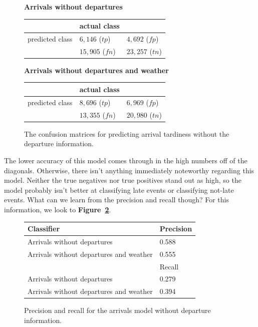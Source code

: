 \documentclass[11pt]{article} %
\begin{document}
\begin{figure}
    \textbf{Arrivals without departures}

    \begin{tabular}[h]{l|ll}
                         & actual class &  \\
         \hline
         predicted class & $6,146$ ($tp$)& $4,692$ ($fp$)\\
                         & $15,905$ ($fn$)& $23,257$ ($tn$)\\
    \end{tabular}

    \textbf{Arrivals without departures and weather}

    \begin{tabular}[h]{l|ll}
                         & actual class &  \\
         \hline
         predicted class & $8,696$ ($tp$)& $6,969$ ($fp$)\\
                         & $13,355$ ($fn$)& $20,980$ ($tn$)\\
    \end{tabular}
    \caption{The confusion matrices for predicting arrival tardiness without
    the departure information.}
    \label{fig:confusion_arrivals_nod}
\end{figure}

The lower accuracy of this model comes through in the high numbers off of the 
diagonals.  Otherwise, there isn't anything immediately noteworthy regarding this
model. Neither the true negatives nor true positives stand out as high, so the
model probably isn't better at classifying late events or classifying not-late
events. What can we learn from the precision and recall though? For this 
information, we look to \textbf{Figure~\ref{fig:pr_arrivals_nod}}.

\begin{figure}
    \begin{tabular}{l|l}
         Classifier & Precision\\
         \hline
         Arrivals without departures & 0.588\\
         Arrivals without departures and weather & 0.555\\
         \hline
          & Recall\\
         \hline
         Arrivals without departures & 0.279\\
         Arrivals without departures and weather& 0.394\\
    \end{tabular}
    \caption{Precision and recall for the arrivals model without departure 
    information.}
    \label{fig:pr_arrivals_nod}
\end{figure}
\end{document}
